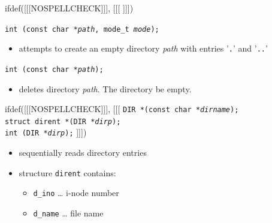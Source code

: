 
ifdef([[[NOSPELLCHECK]]], [[[
]]])


\begin{slide}
\texttt{int (const char *\emph{path}, mode\_t \emph{mode});}
\begin{itemize}
\item attempts to create an empty directory \emph{path} with entries
'\texttt{.}' and '\texttt{..}'
\end{itemize}
\texttt{int (const char *\emph{path});}
\begin{itemize}
\item deletes directory \emph{path}.  The directory  be empty.
\end{itemize}
ifdef([[[NOSPELLCHECK]]], [[[
\texttt{DIR *(const char *\emph{dirname});}\\
\texttt{struct dirent *(DIR *\emph{dirp});}\\
\texttt{int (DIR *\emph{dirp});}
]]])
\begin{itemize}
\item sequentially reads directory entries
\item structure \texttt{dirent} contains:
    \begin{itemize}
    \item \texttt{d\_ino} \dots{} i-node number
    \item \texttt{d\_name} \dots{} file name
    \end{itemize}
\end{itemize}
\end{slide}

